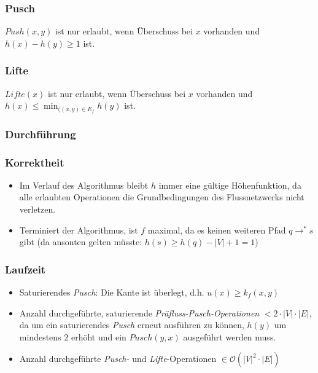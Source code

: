 \subsubsection{Pusch}
\(Push(x,y)\) ist nur erlaubt, wenn Überschuss bei \(x\) vorhanden und \(h(x)-h(y) \geq 1\) ist.


\subsubsection{Lifte}
\(Lifte(x)\) ist nur erlaubt, wenn Überschuss bei \(x\) vorhanden und \(h(x) \leq \min_{((x,y) \in E_f}{h(y)}\) ist.
\text{}\\


\subsubsection{Durchführung}


\subsubsection{Korrektheit}
\begin{itemize}
	\item Im Verlauf des Algorithmus bleibt \(h\) immer eine gültige Höhenfunktion, da alle erlaubten Operationen die Grundbedingungen des Flussnetzwerks nicht verletzen.
	\item Terminiert der Algorithmus, ist \(f\) maximal, da es keinen weiteren Pfad \(q \rightarrow^* s\) gibt (da ansonten gelten müsste: \(h(s) \geq h(q)-|V|+1=1\))
\end{itemize}

\subsubsection{Laufzeit}
\begin{itemize}
	\item Saturierendes \textit{Pusch}: Die Kante ist überlegt, d.h. \(u(x) \geq k_f(x,y)\)
	\item Anzahl durchgeführte, saturierende \textit{Präfluss-Pusch-Operationen} \(< 2 \cdot |V| \cdot |E|\), da um ein saturierendes \textit{Pusch} erneut ausführen zu können, \(h(y)\) um mindestens \(2\) erhöht und ein \(Pusch(y,x)\) ausgeführt werden muss.
	\item Anzahl durchgeführte \textit{Pusch-} und \textit{Lifte}-Operationen \(\in \mathcal{O}(|V|^2\cdot |E|)\)
\end{itemize}


